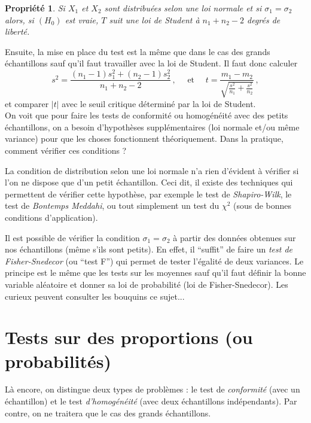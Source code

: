 \documentclass[12pt, a4paper]{book}
\newtheorem{prop}[thm]{Propriété}
\numberwithin{equation}{section}
\begin{document}
\begin{prop}
Si $X_1$ et $X_2$ sont distribuées selon une loi normale et si $\sigma_1=\sigma_2$ alors, si $(H_0)$ est vraie, $T$ suit
une loi de Student à $n_1+n_2-2$ degrés de liberté.
\end{prop}


Ensuite, la mise en place du test est la même que dans le cas des grands échantillons sauf qu'il faut travailler avec la loi de Student. Il faut donc calculer
$$
s^2=\frac{(n_1-1)s_1^2+(n_2-1)s_2^2}{n_1+n_2-2}\,, \quad {\mbox { et }} \quad
t= \frac{m_1-m_2}{\sqrt{\frac{s^2}{n_1}+\frac{s^2}{n_2}} }\,,
$$
et comparer $|t|$ avec le seuil critique déterminé par la loi de Student.\\

 On voit que pour faire les tests de conformité ou homogénéité avec des
petits échantillons, on a besoin d'hypothèses supplémentaires (loi normale et/ou même variance) pour 
que les choses fonctionnent théoriquement. 
Dans la pratique, comment vérifier ces conditions ?

La condition de distribution selon une loi normale n'a rien d'évident à vérifier si l'on ne dispose 
que d'un petit échantillon. Ceci dit, il existe des techniques qui permettent de 
vérifier cette hypothèse, par exemple le test de {\it Shapiro-Wilk}, le test de {\it Bontemps Meddahi}, 
ou tout simplement un test du $\chi^2$ (sous de bonnes conditions d'application).

Il est possible de vérifier la condition $\sigma_1=\sigma_2$ à partir des données obtenues 
sur nos échantillons (même s'ils sont petits). En effet, il ``suffit'' de faire un {\it test de Fisher-Snedecor} (ou ``test F'') qui permet de 
tester l'égalité de deux variances. Le principe est le même que les tests sur les moyennes sauf
qu'il faut définir la bonne variable aléatoire et donner sa loi de probabilité (loi de Fisher-Snedecor).
Les curieux peuvent consulter les bouquins  ce sujet...



\section{Tests sur des proportions (ou probabilités)}

Là encore, on distingue deux types de problèmes : le test de {\it conformité} (avec un échantillon)
et le test {\it d'homogénéité} (avec deux échantillons indépendants).  
Par contre, on ne traitera que le cas des grands échantillons.\\
\end{document}
